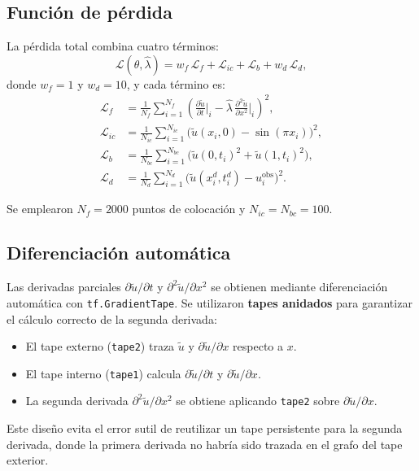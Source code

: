 \documentclass[12pt,a4paper]{article}
\newcommand{\lhat}{\hat{\lambda}}
\newcommand{\Lf}{\mathcal{L}_f}
\newcommand{\Lb}{\mathcal{L}_b}
\newcommand{\Li}{\mathcal{L}_{ic}}
\newcommand{\Ld}{\mathcal{L}_d}
\begin{document}
\subsection{Función de pérdida}

La pérdida total combina cuatro términos:
\begin{equation}
  \mathcal{L}(\theta,\lhat)
  = w_f\,\Lf + \Li + \Lb + w_d\,\Ld,
  \label{eq:loss}
\end{equation}
donde $w_f=1$ y $w_d=10$, y cada término es:
\begin{align}
  \Lf &= \frac{1}{N_f}\sum_{i=1}^{N_f}
         \left(\frac{\partial\tilde{u}}{\partial t}\bigg|_i
         -\lhat\,\frac{\partial^2\tilde{u}}{\partial x^2}\bigg|_i\right)^2, \\[4pt]
  \Li &= \frac{1}{N_{ic}}\sum_{i=1}^{N_{ic}}
         \bigl(\tilde{u}(x_i,0)-\sin(\pi x_i)\bigr)^2, \\[4pt]
  \Lb &= \frac{1}{N_{bc}}\sum_{i=1}^{N_{bc}}
         \bigl(\tilde{u}(0,t_i)^2+\tilde{u}(1,t_i)^2\bigr), \\[4pt]
  \Ld &= \frac{1}{N_d}\sum_{i=1}^{N_d}
         \bigl(\tilde{u}(x_i^d,t_i^d)-u_i^{\text{obs}}\bigr)^2.
\end{align}

Se emplearon $N_f=2000$ puntos de colocación y $N_{ic}=N_{bc}=100$.

\subsection{Diferenciación automática}

Las derivadas parciales $\partial\tilde{u}/\partial t$ y
$\partial^2\tilde{u}/\partial x^2$ se obtienen mediante diferenciación automática con
\texttt{tf.GradientTape}. Se utilizaron \textbf{tapes anidados} para garantizar el cálculo
correcto de la segunda derivada:
\begin{itemize}
  \item El tape externo (\texttt{tape2}) traza $\tilde{u}$ y $\partial\tilde{u}/\partial x$
        respecto a $x$.
  \item El tape interno (\texttt{tape1}) calcula $\partial\tilde{u}/\partial t$ y
        $\partial\tilde{u}/\partial x$.
  \item La segunda derivada $\partial^2\tilde{u}/\partial x^2$ se obtiene aplicando
        \texttt{tape2} sobre $\partial\tilde{u}/\partial x$.
\end{itemize}
Este diseño evita el error sutil de reutilizar un tape persistente para la segunda
derivada, donde la primera derivada no habría sido trazada en el grafo del tape exterior.
\end{document}
